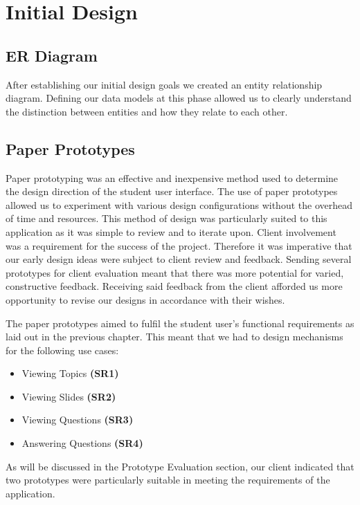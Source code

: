 \documentclass{l3proj}
\begin{document}
\section{Initial Design}

\subsection{ER Diagram}
	
After establishing our initial design goals we created an entity relationship diagram. Defining our data models at this phase allowed us to clearly understand the distinction between entities and how they relate to each other.


\subsection{Paper Prototypes}

Paper prototyping was an effective and inexpensive method used to determine the design direction of the student user interface. The use of paper prototypes allowed us to experiment with various design configurations without the overhead of time and resources. This method of design was particularly suited to this application as it was simple to review and to iterate upon. Client involvement was a requirement for the success of the project. Therefore it was imperative that our early design ideas were subject to client review and feedback. Sending several prototypes for client evaluation meant that there was more potential for varied, constructive feedback. Receiving said feedback from the client afforded us more opportunity to revise our designs in accordance with their wishes. 

The paper prototypes aimed to fulfil the student user's functional requirements as laid out in the previous chapter. This meant that we had to design mechanisms for the following use cases:

\begin{itemize}
\item{Viewing Topics\textbf{ (SR1)}}
\item{Viewing Slides\textbf{ (SR2)}}
\item{Viewing Questions\textbf{ (SR3)}}
\item{Answering Questions\textbf{ (SR4)}}
\end{itemize}

As will be discussed in the Prototype Evaluation section, our client indicated that two prototypes were particularly suitable in meeting the requirements of the application.
\end{document}
